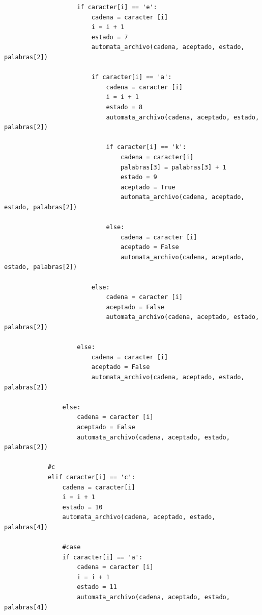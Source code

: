 \documentclass{article}
\begin{document}
\begin{flushleft}
\begin{lstlisting}
                    if caracter[i] == 'e':
                        cadena = caracter [i]
                        i = i + 1
                        estado = 7
                        automata_archivo(cadena, aceptado, estado, palabras[2])
                        
                        if caracter[i] == 'a':
                            cadena = caracter [i]
                            i = i + 1
                            estado = 8
                            automata_archivo(cadena, aceptado, estado, palabras[2])
                            
                            if caracter[i] == 'k':
                                cadena = caracter[i]
                                palabras[3] = palabras[3] + 1
                                estado = 9
                                aceptado = True
                                automata_archivo(cadena, aceptado, estado, palabras[2])
                                
                            else:
                                cadena = caracter [i]
                                aceptado = False
                                automata_archivo(cadena, aceptado, estado, palabras[2])
                        
                        else:
                            cadena = caracter [i]
                            aceptado = False
                            automata_archivo(cadena, aceptado, estado, palabras[2])
                            
                    else:
                        cadena = caracter [i]
                        aceptado = False
                        automata_archivo(cadena, aceptado, estado, palabras[2])
                    
                else:
                    cadena = caracter [i]
                    aceptado = False
                    automata_archivo(cadena, aceptado, estado, palabras[2])
                    
            #c
            elif caracter[i] == 'c':
                cadena = caracter[i]
                i = i + 1
                estado = 10
                automata_archivo(cadena, aceptado, estado, palabras[4])
                
                #case
                if caracter[i] == 'a':
                    cadena = caracter [i]
                    i = i + 1
                    estado = 11
                    automata_archivo(cadena, aceptado, estado, palabras[4])   
                    

\end{lstlisting}
\end{flushleft}
\end{document}
